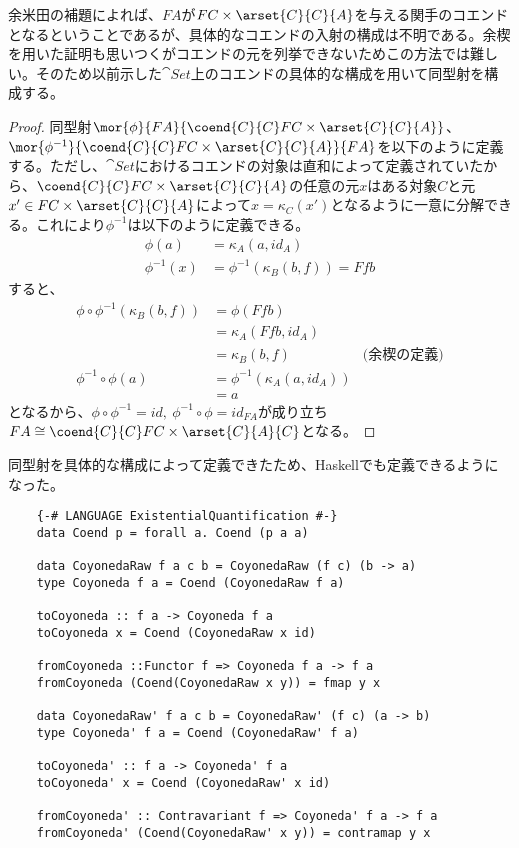 \documentclass[uplatex,dvipdfmx]{jsarticle}
\begin{document}
  余米田の補題によれば、$FA$が$FC\times\arset{C}{C}{A}$を与える関手のコエンドとなるということであるが、具体的なコエンドの入射の構成は不明である。余楔を用いた証明も思いつくがコエンドの元を列挙できないためこの方法では難しい。そのため以前示した$\cat{Set}$上のコエンドの具体的な構成を用いて同型射を構成する。
  \begin{proof}
    同型射$\mor{\phi}{FA}{\coend{C}{C} FC\times\arset{C}{C}{A}}$、$\mor{\phi^{-1}}{\coend{C}{C} FC\times\arset{C}{C}{A}}{FA}$を以下のように定義する。ただし、$\cat{Set}$におけるコエンドの対象は直和によって定義されていたから、$\coend{C}{C} FC\times\arset{C}{C}{A}$の任意の元$x$はある対象$C$と元$x'\in FC\times\arset{C}{C}{A}$によって$x = \kappa_C(x')$となるように一意に分解できる。これにより$\phi^{-1}$は以下のように定義できる。
    \begin{align*}
      \phi(a) &= \kappa_A(a,id_A)\\
      \phi^{-1}(x) &= \phi^{-1}(\kappa_B(b,f)) = Ffb
    \end{align*}
    すると、
    \begin{align*}
      \phi\circ\phi^{-1}(\kappa_B(b,f))&=\phi(Ffb)\\
      &=\kappa_A(Ffb,id_A)\\
      &=\kappa_B(b,f)&\text{(余楔の定義)}\\
      \phi^{-1}\circ\phi(a) &= \phi^{-1}(\kappa_A(a,id_A))\\
      &=a
    \end{align*}
    となるから、$\phi\circ\phi^{-1}=id,\ \phi^{-1}\circ\phi=id_{FA}$が成り立ち$FA\cong\coend{C}{C}FC\times \arset{C}{A}{C}$となる。
  \end{proof}

  同型射を具体的な構成によって定義できたため、Haskellでも定義できるようになった。
  \begin{lstlisting}
    {-# LANGUAGE ExistentialQuantification #-}
    data Coend p = forall a. Coend (p a a)

    data CoyonedaRaw f a c b = CoyonedaRaw (f c) (b -> a)
    type Coyoneda f a = Coend (CoyonedaRaw f a)

    toCoyoneda :: f a -> Coyoneda f a
    toCoyoneda x = Coend (CoyonedaRaw x id)

    fromCoyoneda ::Functor f => Coyoneda f a -> f a
    fromCoyoneda (Coend(CoyonedaRaw x y)) = fmap y x

    data CoyonedaRaw' f a c b = CoyonedaRaw' (f c) (a -> b)
    type Coyoneda' f a = Coend (CoyonedaRaw' f a)

    toCoyoneda' :: f a -> Coyoneda' f a
    toCoyoneda' x = Coend (CoyonedaRaw' x id)

    fromCoyoneda' :: Contravariant f => Coyoneda' f a -> f a
    fromCoyoneda' (Coend(CoyonedaRaw' x y)) = contramap y x
  \end{lstlisting}
\end{document}
